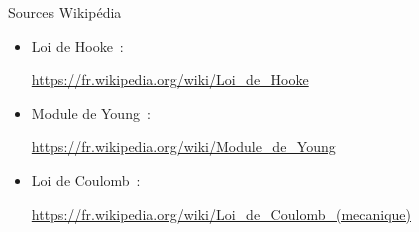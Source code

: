 \documentclass{beamer}
\begin{document}
\begin{frame}{Sources Wikipédia}
  \begin{footnotesize}
    \begin{itemize}
      \item Loi de Hooke~:
	\begin{tiny}
	  \url{https://fr.wikipedia.org/wiki/Loi_de_Hooke}
	\end{tiny}
      \item Module de Young~:
	\begin{tiny}
	  \url{https://fr.wikipedia.org/wiki/Module_de_Young}
	\end{tiny}
      \item Loi de Coulomb~:
	\begin{tiny}
	  \url{https://fr.wikipedia.org/wiki/Loi_de_Coulomb_(mecanique)}
	\end{tiny}
    \end{itemize}
  \end{footnotesize}
\end{frame}
\end{document}
